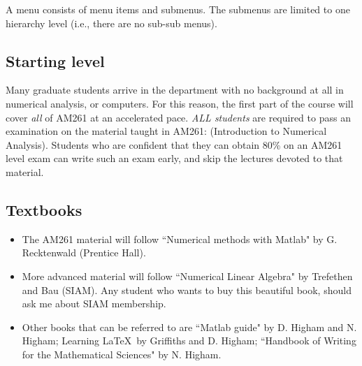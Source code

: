 \documentclass{article}
\begin{document}
A menu consists of menu items and submenus. The submenus are limited to one hierarchy level (i.e., there are no sub-sub menus).






\subsection{Starting level} Many graduate students
arrive in the department with no background at all in numerical analysis, or computers.
For this reason, the first part of the course will cover \textit{all} of
AM261 at an accelerated pace. \textit{ALL students} are
required to pass an examination on the material taught in AM261:
(Introduction to Numerical Analysis).
Students who are confident that they can obtain 80\% on an AM261 level exam can write such an exam
early, and skip the lectures devoted to that material.

\subsection{Textbooks}
\begin{itemize}
\item
The AM261 material will follow ``Numerical methods with Matlab" by G. Recktenwald (Prentice Hall).
\item
More advanced material will follow ``Numerical Linear Algebra" by Trefethen and Bau (SIAM).
Any student who wants to buy this beautiful book, should ask me about SIAM membership.
\item
Other books that can be referred to are ``Matlab guide" by D. Higham and N. Higham;
Learning \LaTeX\ by Griffiths and D. Higham; ``Handbook of Writing for the Mathematical Sciences"
by N. Higham.
\end{itemize}
\end{document}
